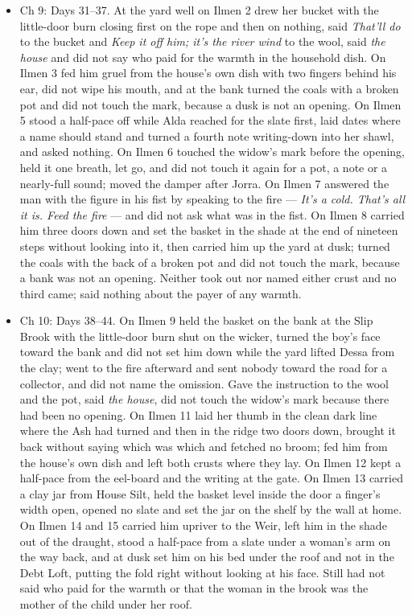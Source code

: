 \documentclass{design/chronicle}
\begin{document}
{\begin{itemize}[leftmargin=1.4em,itemsep=1pt,topsep=3pt,parsep=0pt]
\item Ch 9: Days 31–37. At the yard well on Ilmen 2 drew her bucket with the little-door burn closing first on the rope and then on nothing, said \emph{That’ll do} to the bucket and \emph{Keep it off him; it’s the river wind} to the wool, said \emph{the house} and did not say who paid for the warmth in the household dish. On Ilmen 3 fed him gruel from the house’s own dish with two fingers behind his ear, did not wipe his mouth, and at the bank turned the coals with a broken pot and did not touch the mark, because a dusk is not an opening. On Ilmen 5 stood a half-pace off while Alda reached for the slate first, laid dates where a name should stand and turned a fourth note writing-down into her shawl, and asked nothing. On Ilmen 6 touched the widow’s mark before the opening, held it one breath, let go, and did not touch it again for a pot, a note or a nearly-full sound; moved the damper after Jorra. On Ilmen 7 answered the man with the figure in his fist by speaking to the fire --- \emph{It’s a cold. That’s all it is. Feed the fire} --- and did not ask what was in the fist. On Ilmen 8 carried him three doors down and set the basket in the shade at the end of nineteen steps without looking into it, then carried him up the yard at dusk; turned the coals with the back of a broken pot and did not touch the mark, because a bank was not an opening. Neither took out nor named either crust and no third came; said nothing about the payer of any warmth.

\end{itemize}

\begin{itemize}[leftmargin=1.4em,itemsep=1pt,topsep=3pt,parsep=0pt]

\item Ch 10: Days 38–44. On Ilmen 9 held the basket on the bank at the Slip Brook with the little-door burn shut on the wicker, turned the boy’s face toward the bank and did not set him down while the yard lifted Dessa from the clay; went to the fire afterward and sent nobody toward the road for a collector, and did not name the omission. Gave the instruction to the wool and the pot, said \emph{the house}, did not touch the widow’s mark because there had been no opening. On Ilmen 11 laid her thumb in the clean dark line where the Ash had turned and then in the ridge two doors down, brought it back without saying which was which and fetched no broom; fed him from the house’s own dish and left both crusts where they lay. On Ilmen 12 kept a half-pace from the eel-board and the writing at the gate. On Ilmen 13 carried a clay jar from House Silt, held the basket level inside the door a finger’s width open, opened no slate and set the jar on the shelf by the wall at home. On Ilmen 14 and 15 carried him upriver to the Weir, left him in the shade out of the draught, stood a half-pace from a slate under a woman’s arm on the way back, and at dusk set him on his bed under the roof and not in the Debt Loft, putting the fold right without looking at his face. Still had not said who paid for the warmth or that the woman in the brook was the mother of the child under her roof.


\end{itemize}}
\end{document}

